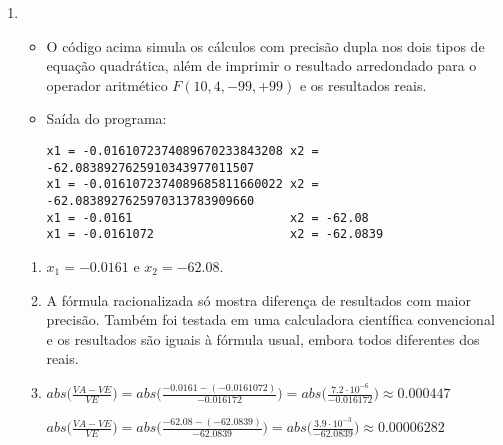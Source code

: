 \documentclass{article}
\newenvironment{arabenum}{
    \begin{enumerate}[label=\textbf{\arabic*})]
}{
    \end{enumerate}
}
\newenvironment{alphenum}{
    \begin{enumerate}[label=(\alph*)]
}{
    \end{enumerate}
}
\newenvironment{discusscode}[1]{
    
    \vspace{-2mm}
    \begin{itemize}
}{
    \end{itemize}
}
\begin{document}
\begin{arabenum}
\begin{discusscode}{div_by_zero.py}
\begin{verbatim}
-0.0000000000000001110223024625156540423631668090820312500
-0.0000000000000001110223024625156540423631668090820312500

1.0000000000000000000000000000000000000000000000000000000
1.0000000000000000000000000000000000000000000000000000000\end{verbatim}

\end{discusscode}

\item \begin{discusscode}{quadratic.py}

\item O código acima simula os cálculos com precisão dupla nos dois tipos de
equação quadrática, além de imprimir o resultado arredondado para o operador
aritmético $F(10, 4, -99, +99)$ e os resultados reais.

\item Saída do programa:

\begin{verbatim}
x1 = -0.0161072374089670233843208 x2 = -62.0838927625910343977011507
x1 = -0.0161072374089685811660022 x2 = -62.0838927625970313783909660
x1 = -0.0161                      x2 = -62.08
x1 = -0.0161072                   x2 = -62.0839
\end{verbatim}

\end{discusscode}

\begin{alphenum}

\item $x_1 = \boldsymbol{-0.0161}$ e $x_2 = \boldsymbol{-62.08}$.

\item A fórmula racionalizada só mostra diferença de resultados com maior
precisão. Também foi testada em uma calculadora científica convencional e os
resultados são iguais à fórmula usual, embora todos diferentes dos reais.

\item $abs\big(\frac{VA - VE}{VE}\big)
= abs\big(\frac{-0.0161 - (-0.0161072)}{-0.016172}\big)
= abs\big(\frac{7.2 \cdot 10^{-6}}{-0.016172}\big)
\approx \boldsymbol{0.000447}$

$abs\big(\frac{VA - VE}{VE}\big)
= abs\big(\frac{-62.08 - (-62.0839)}{-62.0839}\big)
= abs\big(\frac{3.9 \cdot 10^{-3}}{-62.0839}\big)
\approx \boldsymbol{0.00006282}$

\end{alphenum}


\end{arabenum}
\end{document}
